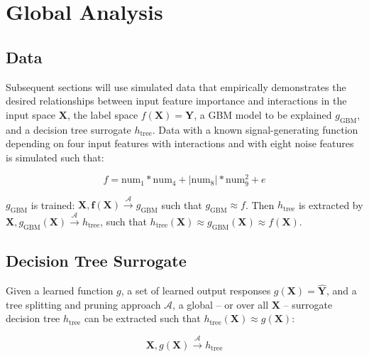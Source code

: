 \documentclass{article}
\begin{document}

\section{Global Analysis}

\subsection{Data}
Subsequent sections will use simulated data that empirically demonstrates the desired relationships between input feature importance and interactions in the input space $\mathbf{X}$, the label space $f(\mathbf{X}) = \mathbf{Y}$, a GBM model to be explained $g_{\text{GBM}}$, and a decision tree surrogate $h_{\text{tree}}$. Data with a known signal-generating function depending on four input features with interactions and with eight noise features is simulated such that: 

\begin{equation}
\label{eq:f}
f = \text{num} _1 * \text{num}_4 + |\text{num}_8| * \text{num}_9^2 + e
\end{equation}

\noindent$g_{\text{GBM}}$ is trained: $ \mathbf{X}, \mathbf{f(X)} \xrightarrow{\mathcal{A}} g_{\text{GBM}}$ such that $g_{\text{GBM}} \approx f$. Then $h_{\text{tree}}$ is extracted by $\mathbf{X}, g_{\text{GBM}}(\mathbf{X}) \xrightarrow{\mathcal{A}} h_{\text{tree}}$, such that $h_{\text{tree}}(\mathbf{X}) \approx g_{\text{GBM}}(\mathbf{X}) \approx f(\mathbf{X})$.

\subsection{Decision Tree Surrogate} \label{sec:surrogate_dt}

Given a learned function $g$, a set of learned output responses $g(\mathbf{X}) = \mathbf{\hat{Y}}$, and a tree splitting and pruning approach $\mathcal{A}$, a global -- or over all $\mathbf{X}$ -- surrogate decision tree $h_{\text{tree}}$ can be extracted such that $h_{\text{tree}}(\mathbf{X}) \approx g(\mathbf{X})$:

\begin{equation}
\mathbf{X}, g(\mathbf{X}) \xrightarrow{\mathcal{A}} h_{\text{tree}}
\end{equation}
\end{document}
